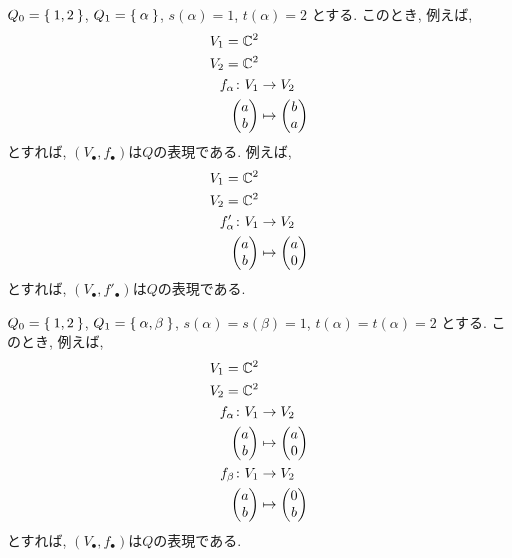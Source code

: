 \begin{example}
  \ZU
  $Q_0=\Set{1,2}$,
  $Q_1=\Set{\alpha}$,
  $s(\alpha)=1$,
  $t(\alpha)=2$
  とする.
  このとき,
  例えば,
  \begin{align*}
    V_1=\mathbb{C}^2&\\
    V_2=\mathbb{C}^2&\\
    f_\alpha\colon V_1&\to V_2\\
    \begin{pmatrix}a\\b\end{pmatrix}
      &\mapsto
    \begin{pmatrix}b\\a\end{pmatrix}
  \end{align*}
  とすれば,
  $(V_\bullet,f_\bullet)$は$Q$の表現である.
  例えば,
  \begin{align*}
    V_1=\mathbb{C}^2&\\
    V_2=\mathbb{C}^2&\\
    f'_\alpha\colon V_1&\to V_2\\
    \begin{pmatrix}a\\b\end{pmatrix}
      &\mapsto
    \begin{pmatrix}a\\0\end{pmatrix}
  \end{align*}
  とすれば,
  $(V_\bullet,f'_\bullet)$は$Q$の表現である.
\end{example}

\begin{example}
  \ZU
  $Q_0=\Set{1,2}$,
  $Q_1=\Set{\alpha,\beta}$,
  $s(\alpha)=s(\beta)=1$,
  $t(\alpha)=t(\alpha)=2$
  とする.
  このとき,
  例えば,
  \begin{align*}
    V_1=\mathbb{C}^2&\\
    V_2=\mathbb{C}^2&\\
    f_\alpha\colon V_1&\to V_2\\
    \begin{pmatrix}a\\b\end{pmatrix}
      &\mapsto
    \begin{pmatrix}a\\0\end{pmatrix}\\
    f_\beta\colon V_1&\to V_2\\
    \begin{pmatrix}a\\b\end{pmatrix}
      &\mapsto
    \begin{pmatrix}0\\b\end{pmatrix}
  \end{align*}
  とすれば,
  $(V_\bullet,f_\bullet)$は$Q$の表現である.
\end{example}

